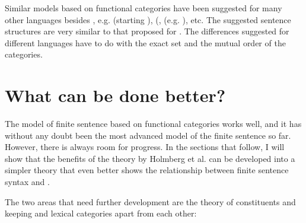 \documentclass[output=paper]{langsci/langscibook}
\begin{document}
Similar models based on functional categories have been suggested for many other languages besides , e.g.  (starting \citealt{Pollock1989}),  (\citealt{HolmbergPlatzack1995},  (e.g. \citealt{Cinque1999}), etc. The suggested sentence structures are very similar to that proposed for . The differences suggested for different languages have to do with the exact set and the mutual order of the categories.

\section{What can be done better?} %

The model of finite sentence based on functional categories works well, and it has without any doubt been the most advanced model of the  finite sentence so far. However, there is always room for progress. In the sections that follow, I will show that the benefits of the theory by Holmberg et al. can be developed into a simpler theory that even better shows the relationship between finite sentence syntax and .

The two areas that need further development are the theory of constituents and keeping  and lexical categories apart from each other:
\end{document}
